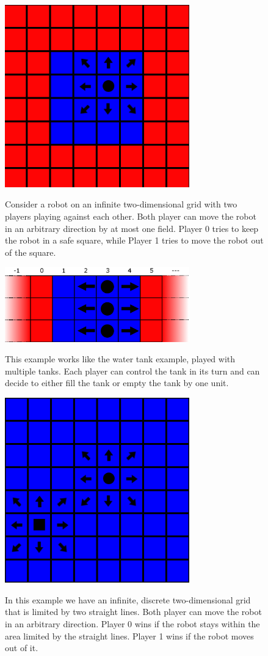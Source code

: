 \documentclass[10pt,a4paper]{article}
\theoremstyle{plain}
\theoremstyle{definition}
\begin{document}
\begin{figure}
  \caption{Consider a robot on an infinite two-dimensional grid with two players playing against each other. Both player can move the robot in an arbitrary direction by at most one field. Player 0 tries to keep the robot in a safe square, while Player 1 tries to move the robot out of the square.
}
  \centering
    {\includegraphics[width=8.0cm]{quadrat.png}} 
\end{figure}


\begin{figure}
  \caption{This example works like the water tank example, played with multiple tanks. Each player can control the tank in its turn and can decide to either fill the tank or empty the tank by one unit.}
  \centering
    {\includegraphics[width=8.0cm]{multi_wasser_tank.png}} 
\end{figure}






\begin{figure}
  \caption{In this example we have an infinite, discrete two-dimensional grid that is limited by two straight lines. Both player can move the robot in an arbitrary direction. Player 0 wins if the robot stays within the area limited by the straight lines. Player 1 wins if the robot moves out of it.}
  \centering
    {\includegraphics[width=8.0cm]{catch.png}} 
\end{figure}
\end{document}
